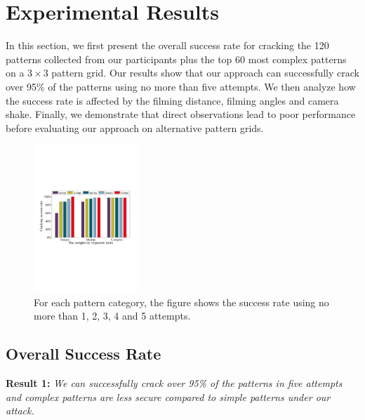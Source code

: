 \section{Experimental Results}
    In this section, we first present the overall success rate for cracking
    the 120 patterns collected from our participants plus the top 60 most complex patterns
    on a $3\times3$ pattern grid.
    Our results show that our approach can successfully crack over 95\% of the
    patterns using no more than five attempts. We then analyze how the
     success rate is affected by the filming distance, filming angles and
    camera shake. Finally, we demonstrate that direct observations lead to poor
    performance before evaluating our approach on alternative pattern grids.

\begin{figure}[!t]
    \centering
    \includegraphics[width=0.35\textwidth]{fig/10.pdf}
    \vspace{-3mm}
    \caption{For each pattern category, the figure shows the success rate using no more than 1, 2, 3, 4 and 5 attempts.}
    \label{fig:fig10}
    \vspace{-2mm}
\end{figure}

    \subsection{Overall Success Rate \label{sec:overall_rate}}

    \noindent \textbf{Result 1:}  \emph{We can successfully crack over 95\% of the patterns in five attempts and complex patterns are less secure compared to simple patterns under our attack.}

